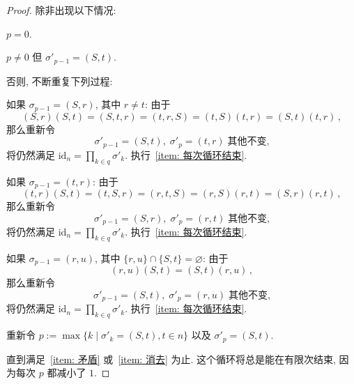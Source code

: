 \documentclass[openany]{ctexbook}
\theoremstyle{plain}
\theoremstyle{definition}
\newcommand*{\id}{\mathrm{id}} %
\begin{document}
\begin{proof}
	除非出现以下情况:
	\begin{conditionlist}[label=\alph*)]
		\item $p = 0$. \label{item: 矛盾}
		\item $p \neq 0$ 但 $\sigma'_{p - 1} = (S, t)$. \label{item: 消去}
	\end{conditionlist}
	否则, 不断重复下列过程:
	\begin{conditionlist}[label=\arabic*)]
		\item 如果 $\sigma_{p - 1} = (S, r)$, 其中 $r \neq t$:
			由于
			\begin{equation*}
				(S, r)(S, t) = (S, t, r) = (t, r, S) 
				= (t, S)(t, r) = (S, t)(t, r)\,,
			\end{equation*}
			那么重新令
			\begin{equation*}
				\sigma'_{p - 1} = (S, t),\; 
				\sigma'_p = (t, r)\;
				\text{其他不变,} 
			\end{equation*}
			将仍然满足 $\id_n = \prod_{k \in q} \sigma'_k$. 
			执行~\ref{item: 每次循环结束}. 
		\item 如果 $\sigma_{p - 1} = (t, r)$:
			由于
			\begin{equation*}
				(t, r)(S, t) = (t, S, r) = (r, t, S) 
				= (r, S)(r, t) = (S, r)(r, t)\,,
			\end{equation*}
			那么重新令
			\begin{equation*}
				\sigma'_{p - 1} = (S, r),\; 
				\sigma'_p = (r, t)\;
				\text{其他不变,} 
			\end{equation*}
			将仍然满足 $\id_n = \prod_{k \in q} \sigma'_k$. 
			执行~\ref{item: 每次循环结束}. 
		\item 如果 $\sigma_{p - 1} = (r, u)$, 其中 $\{r, u\} \cap \{S, t\} = \varnothing$:
			由于
			\begin{equation*}
				(r, u)(S, t) = (S, t)(r, u)\,,
			\end{equation*}
			那么重新令
			\begin{equation*}
				\sigma'_{p - 1} = (S, t),\; 
				\sigma'_p = (r, u)\;
				\text{其他不变,} 
			\end{equation*}
			将仍然满足 $\id_n = \prod_{k \in q} \sigma'_k$. 
			执行~\ref{item: 每次循环结束}. 
		\item 重新令 $p := \max\{ k \mid \sigma'_k = (S,t), t\in n\}$ 以及 $\sigma'_p = (S, t)$. \label{item: 每次循环结束}
	\end{conditionlist}
	直到满足~\ref{item: 矛盾} 或~\ref{item: 消去} 为止. 
	这个循环将总是能在有限次结束, 因为每次 $p$ 都减小了 $1$.


\end{proof}
\end{document}

